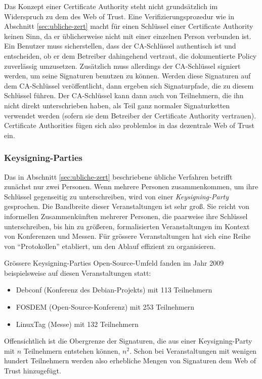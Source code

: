 Das Konzept einer Certificate Authority steht nicht grundsätzlich im
Widerspruch zu dem des Web of Trust. Eine Verifizierungsprozedur wie
in Abschnitt \ref{sec:ubliche-zert} macht für einen Schlüssel
einer Certificate Authority keinen Sinn, da er üblicherweise nicht
mit einer einzelnen Person verbunden ist. Ein Benutzer muss
sicherstellen, dass der CA-Schlüssel authentisch ist und
entscheiden, ob er dem Betreiber dahingehend vertraut, die
dokumentierte Policy zuverlässig umzusetzen. Zusätzlich muss
allerdings der CA-Schlüssel signiert werden, um seine Signaturen
benutzen zu können. Werden diese Signaturen auf dem CA-Schlüssel
veröffentlicht, dann ergeben sich Signaturpfade, die zu diesem
Schlüssel führen. Der CA-Schlüssel kann dann auch von
Teilnehmern, die ihn nicht direkt unterschrieben haben, als Teil ganz
normaler Signaturketten verwendet werden (sofern sie dem Betreiber der
Certificate Authority vertrauen). Certificate Authorities fügen sich
also problemlos in das dezentrale Web of Trust ein.

\subsubsection{Keysigning-Parties}
\label{sec:keysigning-parties}

Das in Abschnitt \ref{sec:ubliche-zert} beschriebene übliche Verfahren
betrifft zunächst nur zwei Personen. Wenn mehrere Personen
zusammenkommen, um ihre Schlüssel gegenseitig zu unterschreiben, wird
von einer \emph{Keysigning-Party} gesprochen. Die Bandbreite dieser
Veranstaltungen ist sehr groß. Sie reicht von informellen
Zusammenkünften mehrerer Personen, die paarweise ihre Schlüssel
unterschreiben, bis hin zu größeren, formalisierten Veranstaltungen im
Kontext von Konferenzen und Messen. Für grössere
Veranstaltungen hat sich eine Reihe von ``Protokollen'' etabliert, um
den Ablauf effizient zu organisieren\cite{Brennen2008}.

Grössere Keysigning-Parties Open-Source-Umfeld fanden im Jahr 2009
beispielsweise auf diesen Veranstaltungen statt:
\begin{itemize}
\item Debconf (Konferenz des Debian-Projekts) mit 113 Teilnehmern
\item FOSDEM (Open-Source-Konferenz) mit 253 Teilnehmern
\item LinuxTag (Messe) mit 132 Teilnehmern
\end{itemize}

Offensichtlich ist die Obergrenze der Signaturen, die aus einer
Keysigning-Party mit $n$ Teilnehmern entstehen können, $n^2$. Schon
bei Veranstaltungen mit wenigen hundert Teilnehmern werden also
erhebliche Mengen von Signaturen dem Web of Trust hinzugefügt.

